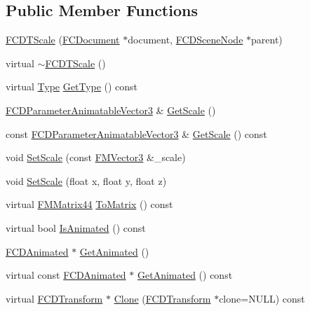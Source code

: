\subsection*{Public Member Functions}
\begin{DoxyCompactItemize}
\item 
\hyperlink{classFCDTScale_aef81961b008c48c0278c74be54b9a8da}{FCDTScale} (\hyperlink{classFCDocument}{FCDocument} $\ast$document, \hyperlink{classFCDSceneNode}{FCDSceneNode} $\ast$parent)
\item 
virtual \hyperlink{classFCDTScale_a6fca0585872dcba041d3e952c01e7577}{$\sim$FCDTScale} ()
\item 
virtual \hyperlink{classFCDTransform_a13e561c5e53aeaf84dedf4661cdc8921}{Type} \hyperlink{classFCDTScale_a69a9e36fcc1a3ba516a3a0f47c37db61}{GetType} () const 
\item 
\hyperlink{classFCDParameterAnimatableT}{FCDParameterAnimatableVector3} \& \hyperlink{classFCDTScale_a9810b2f9ba71699c09e9b9e8b494ea06}{GetScale} ()
\item 
const \hyperlink{classFCDParameterAnimatableT}{FCDParameterAnimatableVector3} \& \hyperlink{classFCDTScale_a0eabcb0f6e8eb152529b41071650751c}{GetScale} () const 
\item 
void \hyperlink{classFCDTScale_a4fb83f56790d88afeaf43dea90b710e7}{SetScale} (const \hyperlink{classFMVector3}{FMVector3} \&\_\-scale)
\item 
void \hyperlink{classFCDTScale_a4354c67b84bca84d5f73ed0e34d8ac29}{SetScale} (float x, float y, float z)
\item 
virtual \hyperlink{classFMMatrix44}{FMMatrix44} \hyperlink{classFCDTScale_a7f80ee90e5633814c7d5bcfb2acc211f}{ToMatrix} () const 
\item 
virtual bool \hyperlink{classFCDTScale_ac7ec837e495c1316d5f87b964318556c}{IsAnimated} () const 
\item 
\hyperlink{classFCDAnimated}{FCDAnimated} $\ast$ \hyperlink{classFCDTScale_a5fd5d51e06c6a5bd56090bd24430d43d}{GetAnimated} ()
\item 
virtual const \hyperlink{classFCDAnimated}{FCDAnimated} $\ast$ \hyperlink{classFCDTScale_aeb7d457dbfc74d96173b4dba7a46a351}{GetAnimated} () const 
\item 
virtual \hyperlink{classFCDTransform}{FCDTransform} $\ast$ \hyperlink{classFCDTScale_a84c265a6be65aabb9cdfb26320da32fe}{Clone} (\hyperlink{classFCDTransform}{FCDTransform} $\ast$clone=NULL) const 
\end{DoxyCompactItemize}


